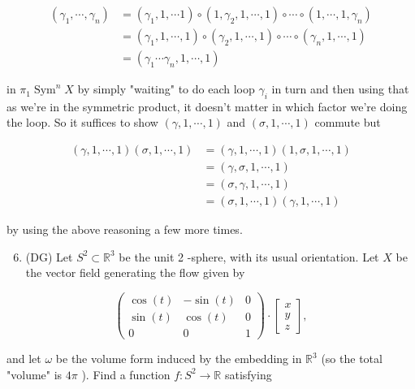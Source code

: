\documentclass[10pt]{article}
\begin{document}
$$
\begin{aligned}
\left(\gamma_{1}, \cdots, \gamma_{n}\right) & =\left(\gamma_{1}, 1, \cdots 1\right) \circ\left(1, \gamma_{2}, 1, \cdots, 1\right) \circ \cdots \circ\left(1, \cdots, 1, \gamma_{n}\right) \\
& =\left(\gamma_{1}, 1, \cdots, 1\right) \circ\left(\gamma_{2}, 1, \cdots, 1\right) \circ \cdots \circ\left(\gamma_{n}, 1, \cdots, 1\right) \\
& =\left(\gamma_{1} \cdots \gamma_{n}, 1, \cdots, 1\right)
\end{aligned}
$$

in $\pi_{1} \operatorname{Sym}^{n} X$ by simply "waiting" to do each loop $\gamma_{i}$ in turn and then using that as we're in the symmetric product, it doesn't matter in which factor we're doing the loop. So it suffices to show $(\gamma, 1, \cdots, 1)$ and $(\sigma, 1, \cdots, 1)$ commute
but

$$
\begin{aligned}
(\gamma, 1, \cdots, 1)(\sigma, 1, \cdots, 1) & =(\gamma, 1, \cdots, 1)(1, \sigma, 1, \cdots, 1) \\
& =(\gamma, \sigma, 1, \cdots, 1) \\
& =(\sigma, \gamma, 1, \cdots, 1) \\
& =(\sigma, 1, \cdots, 1)(\gamma, 1, \cdots, 1)
\end{aligned}
$$

by using the above reasoning a few more times.

\begin{enumerate}
  \setcounter{enumi}{5}
  \item (DG) Let $S^{2} \subset \mathbb{R}^{3}$ be the unit 2 -sphere, with its usual orientation. Let $X$ be the vector field generating the flow given by
\end{enumerate}

$$
\left(\begin{array}{ccc}
\cos (t) & -\sin (t) & 0 \\
\sin (t) & \cos (t) & 0 \\
0 & 0 & 1
\end{array}\right) \cdot\left[\begin{array}{l}
x \\
y \\
z
\end{array}\right],
$$

and let $\omega$ be the volume form induced by the embedding in $\mathbb{R}^{3}$ (so the total "volume" is $4 \pi$ ). Find a function $f: S^{2} \rightarrow \mathbb{R}$ satisfying
\end{document}
